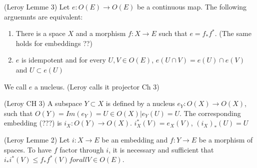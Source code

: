 \begin{lemma}[Nucleus]
(Leroy Lemme 3)
    \label{lem:nucleus}
    Let $e : O(E) \rightarrow O(E)$ be a continuous map. The following arguemnts are equivalent:
    \begin{enumerate}
        \item There is a space $X$ and a morphism $f: X \rightarrow E$ such that $e = f_*f^*$. (The same holds for embeddings ??)
        \item $e$ is idempotent and for every $U, V \in O(E)$, $e(U \cap V) = e(U) \cap e(V)$ and $U \subset e(U)$
    \end{enumerate}
    We call $e$ a nucleus. (Leroy calls it projector Ch 3)
\end{lemma}

\begin{lemma}[Image]
(Leroy CH 3)
    \label{lem:image}
    A subspace $Y \subset X$ is defined by a nucleus $e_Y: O(X) \rightarrow O(X)$, such that $O(Y) = Im(e_Y) = {U \in O(X) | e_Y(U) = U}$.
    The corresponding embedding (???) is $i_X : O(Y) \rightarrow O(X)$. $i^*_X(V) = e_X(V)$, $(i_X)_*(U) = U$
\end{lemma}

\begin{lemma}[factorisation]
(Leroy Lemme 2)
    \label{lem:factorisation}
    Let $i : X \rightarrow E$ be an embedding and $f: Y \rightarrow E$ be a morphism of spaces. To have $f$ factor through $i$, it is necessary and sufficient that $i_*i^*(V) \le f_*f^*(V) for all V \in O(E)$.
\end{lemma}









